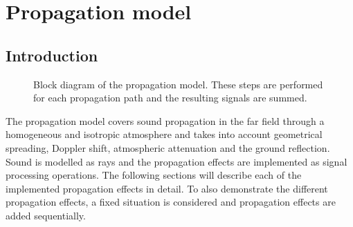 \section{Propagation model}\label{sec:tool:propagation}

\subsection{Introduction}
\begin{wrapfigure}{r}{0.3\textwidth}
  \centering
{}
  \caption{Block diagram of the propagation model. These steps are performed for each propagation path and the resulting signals are summed.}
  \label{fig:propagation_block_diagram}
\end{wrapfigure}



The propagation model covers sound propagation in the far field through a
homogeneous and isotropic atmosphere and takes into account geometrical
spreading, Doppler shift, atmospheric attenuation and the ground reflection.
Sound is modelled as rays and the propagation effects are implemented as signal
processing operations.
The following sections will describe each of the implemented propagation effects
in detail. To also demonstrate the different propagation effects, a fixed
situation is considered and propagation effects are added sequentially.

